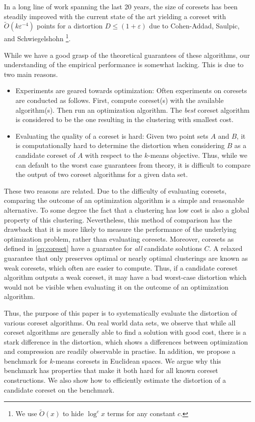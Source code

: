 In a long line of work spanning the last 20 years\cite{BecchettiBC0S19,BravermanJKW21,Chen09,FL11,FeldmanSS20,
HaM04,HaK07,huang2020coresets,BravermanJKW21,LS10,SohlerW18}, the size of coresets has been steadily improved with the current state of the art yielding a coreset with $\tilde{O}(k\varepsilon^{-4})$ points for a distortion $D\leq (1+\varepsilon)$ due to Cohen-Addad, Saulpic, and Schwiegelshohn \cite{Cohen-AddadSS21}\footnote{We use $\tilde O(x)$ to hide $\log^c x$ terms for any constant $c$.}.

While we have a good grasp of the theoretical guarantees of these algorithms, our understanding of the empirical performance is somewhat lacking.
This is due to two main reasons.
\begin{itemize}
\item Experiments are geared towards optimization: Often experiments on coresets are conducted as follows. First, compute coreset(s) with the available algorithm(s). Then run an optimization algorithm. The \emph{best} coreset algorithm is considered to be the one resulting in the clustering with smallest cost. 
\item Evaluating the quality of a coreset is hard: Given two point sets $A$ and $B$, it is computationally hard to determine the distortion when considering $B$ as a candidate coreset of $A$ with respect to the $k$-means objective.  Thus, while we can default to the worst case guarantees from theory, it is difficult to compare the output of two coreset algorithms for a given data set. 
\end{itemize}

These two reasons are related. Due to the difficulty of evaluating coresets, comparing the outcome of an optimization algorithm is a simple and reasonable alternative. To some degree the fact that a clustering has low cost is also a global property of this clustering.
Nevertheless, this method of comparison has the drawback that it is more likely to measure the performance of the underlying optimization problem, rather than evaluating coresets. Moreover, coresets as defined in \cref{eq:coreset} have a guarantee for \emph{all} candidate solutions $C$. A relaxed guarantee that only preserves optimal or nearly optimal clusterings are known as weak coresets, which often are easier to compute. Thus, if a candidate coreset algorithm outputs a weak coreset, it may have a bad worst-case distortion which would not be visible when evaluating it on the outcome of an optimization algorithm.

Thus, the purpose of this paper is to systematically evaluate the distortion of various coreset algorithms.
On real world data sets, we observe that while all coreset algorithms are generally able to find a solution with good cost, there is a stark difference in the distortion, which shows a differences between optimization and compression are readily observable in practise.
In addition, we propose a benchmark for $k$-means coresets in Euclidean spaces.
We argue why this benchmark has properties that make it both hard for all known coreset constructions. We also show how to efficiently estimate the distortion of a candidate coreset on the benchmark.
